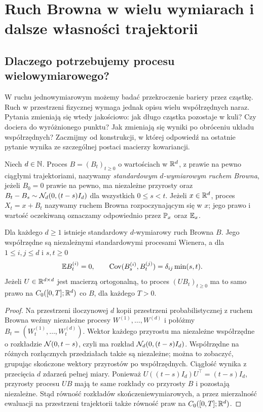 \chapter{Ruch Browna w wielu wymiarach i dalsze własności trajektorii}
\label{ch:brown-multi}

\section{Dlaczego potrzebujemy procesu wielowymiarowego?}
W ruchu jednowymiarowym możemy badać przekroczenie bariery przez
cząstkę. Ruch w przestrzeni fizycznej wymaga jednak opisu wielu
współrzędnych naraz. Pytania zmieniają się wtedy jakościowo:
jak długo cząstka pozostaje w kuli? Czy dociera do wyróżnionego
punktu? Jak zmieniają się wyniki po obróceniu układu współrzędnych?
Zacznijmy od konstrukcji, w której odpowiedź na ostatnie pytanie
wynika ze szczególnej postaci macierzy kowariancji.

\begin{definicja}
Niech $d\in\mathbb{N}$. Proces $B=(B_t)_{t\ge0}$ o wartościach
w $\mathbb{R}^d$, z prawie na pewno ciągłymi trajektoriami, nazywamy
\emph{standardowym $d$-wymiarowym ruchem Browna}, jeżeli
$B_0=0$ prawie na pewno, ma niezależne przyrosty oraz
$B_t-B_s\sim\mathcal{N}_d(0,(t-s)I_d)$ dla wszystkich $0\le s<t$.
Jeżeli $x\in\mathbb{R}^d$, proces $X_t=x+B_t$ nazywamy ruchem Browna
rozpoczynającym się w $x$; jego prawo i wartość oczekiwaną oznaczamy
odpowiednio przez $\mathbb{P}_x$ oraz $\mathbb{E}_x$.
\end{definicja}

\begin{twierdzenie}
Dla każdego $d\ge1$ istnieje standardowy $d$-wymiarowy ruch
Browna $B$. Jego współrzędne są niezależnymi standardowymi
procesami Wienera, a dla $1\le i,j\le d$ i $s,t\ge0$
\[
\mathbb{E} B_t^{(i)}=0,\qquad
\operatorname{Cov}(B_s^{(i)},B_t^{(j)})=\delta_{ij}\min(s,t).
\]
Jeżeli $U\in\mathbb{R}^{d\times d}$ jest macierzą ortogonalną,
to proces $(UB_t)_{t\ge0}$ ma to samo prawo na
$C_0([0,T];\mathbb{R}^d)$ co $B$, dla każdego $T>0$.
\end{twierdzenie}
\begin{proof}
Na przestrzeni iloczynowej $d$ kopii przestrzeni probabilistycznej
z ruchem Browna weźmy niezależne procesy $W^{(1)},\ldots,W^{(d)}$
i połóżmy $B_t=(W_t^{(1)},\ldots,W_t^{(d)})$.
Wektor każdego przyrostu ma niezależne współrzędne o rozkładzie
$\mathcal{N}(0,t-s)$, czyli ma rozkład $\mathcal{N}_d(0,(t-s)I_d)$.
Współrzędne na różnych rozłącznych przedziałach także są niezależne;
można to zobaczyć, grupując skończone wektory przyrostów po
współrzędnych. Ciągłość wynika z przecięcia $d$ zdarzeń pełnej miary.
Ponieważ $U((t-s)I_d)U^\top=(t-s)I_d$, przyrosty procesu $UB$
mają te same rozkłady co przyrosty $B$ i pozostają niezależne.
Stąd równość rozkładów skończeniewymiarowych, a przez mierzalność
ewaluacji na przestrzeni trajektorii także równość praw na
$C_0([0,T];\mathbb{R}^d)$.
\end{proof}

